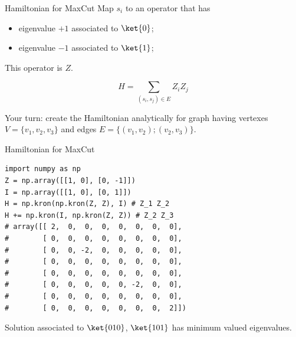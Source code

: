 \begin{frame}{Hamiltonian for MaxCut}
Map \(s_i\) to an operator that has 
\begin{itemize}
    \item eigenvalue \(+1\) associated to \(\ket{0}\);
    \item eigenvalue \(-1\) associated to \(\ket{1}\);
\end{itemize}

This operator is \(Z\). \bigskip

\[ H = \sum\limits_{(s_i, s_j) \in E} Z_i Z_j \]

\alert{Your turn}: create the Hamiltonian analytically for graph having vertexes \(V = \{v_1, v_2, v_3\}\) and edges \(E=\{(v_1, v_2); (v_2, v_3)\}\). 

\begin{center}
\end{center}

\end{frame}

\begin{frame}[fragile]{Hamiltonian for MaxCut}
\begin{verbatim}
import numpy as np
Z = np.array([[1, 0], [0, -1]])
I = np.array([[1, 0], [0, 1]])
H = np.kron(np.kron(Z, Z), I) # Z_1 Z_2
H += np.kron(I, np.kron(Z, Z)) # Z_2 Z_3
# array([[ 2,  0,  0,  0,  0,  0,  0,  0],
#        [ 0,  0,  0,  0,  0,  0,  0,  0],
#        [ 0,  0, -2,  0,  0,  0,  0,  0],
#        [ 0,  0,  0,  0,  0,  0,  0,  0],
#        [ 0,  0,  0,  0,  0,  0,  0,  0],
#        [ 0,  0,  0,  0,  0, -2,  0,  0],
#        [ 0,  0,  0,  0,  0,  0,  0,  0],
#        [ 0,  0,  0,  0,  0,  0,  0,  2]])
\end{verbatim}

Solution associated to \(\ket{010}\), \(\ket{101}\) has minimum valued eigenvalues.
\end{frame}